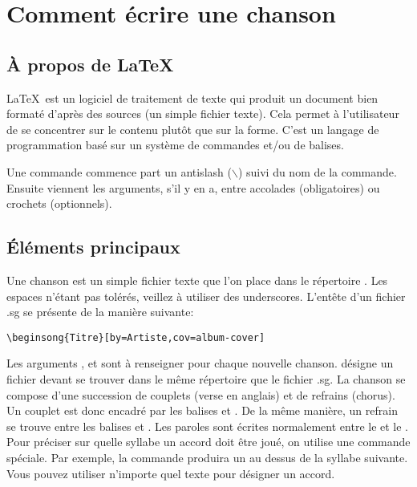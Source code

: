 \documentclass[versionenligne]{framabook}
\begin{document}
\section{Comment écrire une chanson}

\subsection{À propos de \LaTeX\,}

\LaTeX\, est un logiciel de traitement de texte qui produit un document
bien formaté d'après des sources (un simple fichier texte). Cela
permet à l'utilisateur de se concentrer sur le contenu plutôt que sur
la forme. C'est un langage de programmation basé sur un système de
commandes et/ou de balises.

Une commande commence part un antislash ($\backslash$) suivi du nom
de la commande. Ensuite viennent les arguments, s'il y en a, entre
accolades (obligatoires) ou crochets (optionnels).

\subsection{Éléments principaux}

Une chanson est un simple fichier texte  que l'on
place dans le répertoire . Les espaces n'étant
pas tolérés, veillez à utiliser des underscores. L'entête d'un fichier
.sg se présente de la manière suivante:

\begin{verbatim}
\beginsong{Titre}[by=Artiste,cov=album-cover]
\end{verbatim}

Les arguments ,  et  sont
à renseigner pour chaque nouvelle chanson.  désigne
un fichier  devant se trouver dans le même
répertoire que le fichier .sg.  La chanson se compose d'une succession
de couplets (verse en anglais) et de refrains (chorus). Un couplet est
donc encadré par les balises  et . De
la même manière, un refrain se trouve entre les balises
 et .  Les paroles sont écrites
normalement entre le  et le . Pour
préciser sur quelle syllabe un accord doit être joué, on utilise une
commande spéciale. Par exemple, la commande \latexcom{[Mi]} produira
un  au dessus de la syllabe suivante. Vous pouvez utiliser n'importe
quel texte pour désigner un accord.
\end{document}
